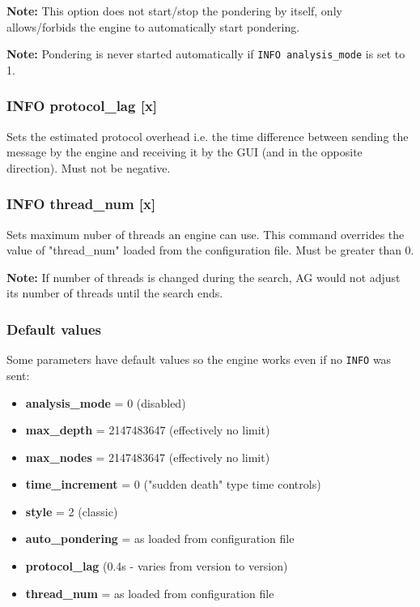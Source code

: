 \documentclass[12pt,a4paper]{article}
\begin{document}
\textbf{Note:} This option does not start/stop the pondering by itself, only allows/forbids the engine to automatically start pondering.

\textbf{Note:} Pondering is never started automatically if \texttt{INFO analysis{\_}mode} is set to 1.

\subsubsection{INFO protocol{\_}lag [x]}
Sets the estimated protocol overhead i.e. the time difference between sending the message by the engine and receiving it by the GUI (and in the opposite direction). Must not be negative.

\subsubsection{INFO thread{\_}num [x]}
Sets maximum nuber of threads an engine can use. This command overrides the value of "thread{\_}num" loaded from the configuration file. Must be greater than 0. 

\textbf{Note:} If number of threads is changed during the search, AG would not adjust its number of threads until the search ends.

\subsubsection{Default values}
Some parameters have default values so the engine works even if no \texttt{INFO} was sent:
\begin{itemize}
\item{\textbf{analysis{\_}mode} = 0 (disabled)}
\item{\textbf{max{\_}depth } = 2147483647 (effectively no limit)}
\item{\textbf{max{\_}nodes} = 2147483647 (effectively no limit)}
\item{\textbf{time{\_}increment} = 0 ("sudden death" \cite{suddendeath} type time controls)}
\item{\textbf{style} = 2 (classic)}
\item{\textbf{auto{\_}pondering} = as loaded from configuration file}
\item{\textbf{protocol{\_}lag}  (0.4s - varies from version to version)}
\item{\textbf{thread{\_}num} = as loaded from configuration file}
\end{itemize}
\end{document}
